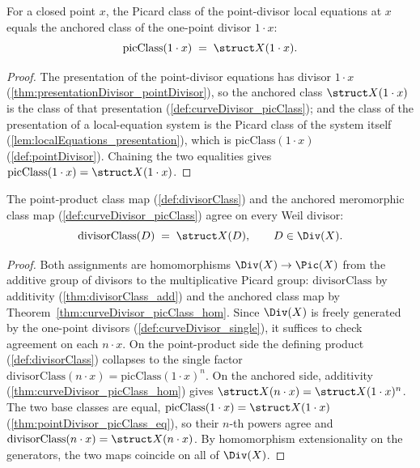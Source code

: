 \begin{theorem}
  \label{thm:pointDivisor_picClass_eq}
  \leanok
  For a closed point \(x\), the Picard class of the point-divisor local equations at \(x\) equals
  the anchored class of the one-point divisor \(1 \cdot x\):
  \[
    \mathrm{picClass}(1 \cdot x) \;=\; \struct X(1 \cdot x).
  \]
\end{theorem}
\begin{proof}
  \leanok
  The presentation of the point-divisor equations has divisor \(1 \cdot x\)
  (\ref{thm:presentationDivisor_pointDivisor}), so the anchored class \(\struct X(1 \cdot x)\) is
  the class of that presentation (\ref{def:curveDivisor_picClass}); and the class of the
  presentation of a local-equation system is the Picard class of the system itself
  (\ref{lem:localEquations_presentation}), which is \(\mathrm{picClass}(1 \cdot x)\)
  (\ref{def:pointDivisor}). Chaining the two equalities gives \(\mathrm{picClass}(1 \cdot x) =
  \struct X(1 \cdot x)\).
\end{proof}

\begin{theorem}
  \label{thm:divisorClass_eq_picClass}
  \leanok
  The point-product class map (\ref{def:divisorClass}) and the anchored meromorphic class map
  (\ref{def:curveDivisor_picClass}) agree on every Weil divisor:
  \[
    \mathrm{divisorClass}(D) \;=\; \struct X(D), \qquad D \in \Div(X).
  \]
\end{theorem}
\begin{proof}
  \leanok
  Both assignments are homomorphisms \(\Div(X) \to \Pic(X)\) from the additive group of divisors to
  the multiplicative Picard group: \(\mathrm{divisorClass}\) by additivity
  (\ref{thm:divisorClass_add}) and the anchored class map by
  Theorem~\ref{thm:curveDivisor_picClass_hom}. Since \(\Div(X)\) is freely generated by the
  one-point divisors (\ref{def:curveDivisor_single}), it suffices to check agreement on each
  \(n \cdot x\). On the point-product side the defining product (\ref{def:divisorClass}) collapses
  to the single factor \(\mathrm{divisorClass}(n \cdot x) = \mathrm{picClass}(1 \cdot x)^{n}\). On
  the anchored side, additivity (\ref{thm:curveDivisor_picClass_hom}) gives \(\struct X(n \cdot x) =
  \struct X(1 \cdot x)^{n}\). The two base classes are equal, \(\mathrm{picClass}(1 \cdot x) =
  \struct X(1 \cdot x)\) (\ref{thm:pointDivisor_picClass_eq}), so their \(n\)-th powers agree and
  \(\mathrm{divisorClass}(n \cdot x) = \struct X(n \cdot x)\). By homomorphism extensionality on the
  generators, the two maps coincide on all of \(\Div(X)\).
\end{proof}

